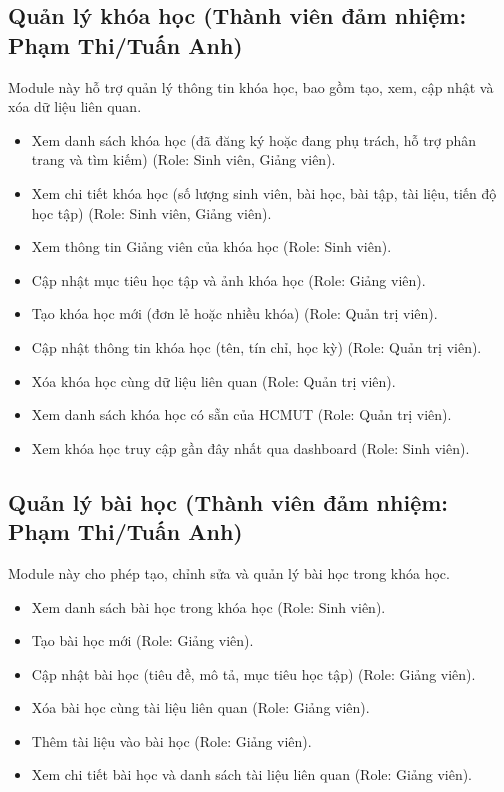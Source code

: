 \subsection{Quản lý khóa học (Thành viên đảm nhiệm: Phạm Thi/Tuấn Anh)}
Module này hỗ trợ quản lý thông tin khóa học, bao gồm tạo, xem, cập nhật và xóa dữ liệu liên quan.
\begin{itemize}[label=--]
    \item Xem danh sách khóa học (đã đăng ký hoặc đang phụ trách, hỗ trợ phân trang và tìm kiếm) (Role: Sinh viên, Giảng viên).
    \item Xem chi tiết khóa học (số lượng sinh viên, bài học, bài tập, tài liệu, tiến độ học tập) (Role: Sinh viên, Giảng viên).
    \item Xem thông tin Giảng viên của khóa học (Role: Sinh viên).
    \item Cập nhật mục tiêu học tập và ảnh khóa học (Role: Giảng viên).
    \item Tạo khóa học mới (đơn lẻ hoặc nhiều khóa) (Role: Quản trị viên).
    \item Cập nhật thông tin khóa học (tên, tín chỉ, học kỳ) (Role: Quản trị viên).
    \item Xóa khóa học cùng dữ liệu liên quan (Role: Quản trị viên).
    \item Xem danh sách khóa học có sẵn của HCMUT (Role: Quản trị viên).
    \item Xem khóa học truy cập gần đây nhất qua dashboard (Role: Sinh viên).
\end{itemize}

\subsection{Quản lý bài học (Thành viên đảm nhiệm: Phạm Thi/Tuấn Anh)}
Module này cho phép tạo, chỉnh sửa và quản lý bài học trong khóa học.
\begin{itemize}[label=--]
    \item Xem danh sách bài học trong khóa học (Role: Sinh viên).
    \item Tạo bài học mới (Role: Giảng viên).
    \item Cập nhật bài học (tiêu đề, mô tả, mục tiêu học tập) (Role: Giảng viên).
    \item Xóa bài học cùng tài liệu liên quan (Role: Giảng viên).
    \item Thêm tài liệu vào bài học (Role: Giảng viên).
    \item Xem chi tiết bài học và danh sách tài liệu liên quan (Role: Giảng viên).
\end{itemize}

